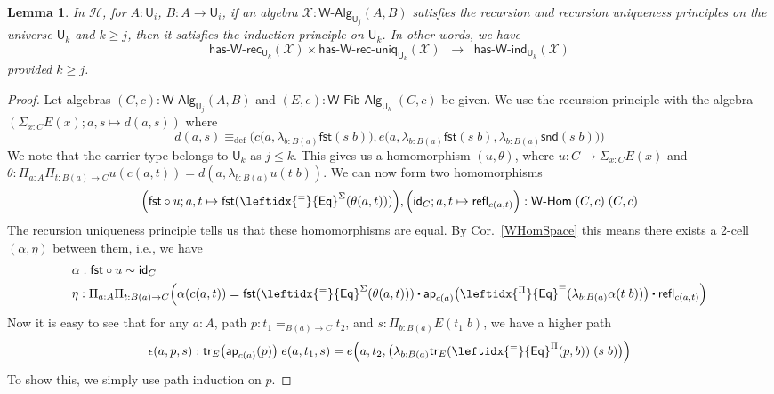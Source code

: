 \documentclass[reqno,10pt,a4paper,oneside]{amsart}
\numberwithin{equation}{section}
\theoremstyle{mythm}
\newtheorem{lemma}[theorem]{Lemma}
\theoremstyle{mydef}
\theoremstyle{myrmk}
\newcommand{\deq}{\equiv}
\newcommand{\defeq}{\deq_{\mathrm{def}}}
\newcommand{\idfun}[1]{\mathsf{id}_{#1}}
\newcommand{\comp}{\circ}
\newcommand{\Hint}{\mathcal{H}}
\newcommand{\trans}{\mathsf{tr}}
\newcommand{\ct}{%
  \mathchoice{\mathbin{\raisebox{0.5ex}{$\displaystyle\centerdot$}}}%
             {\mathbin{\raisebox{0.5ex}{$\centerdot$}}}%
             {\mathbin{\raisebox{0.25ex}{$\scriptstyle\,\centerdot\,$}}}%
             {\mathbin{\raisebox{0.1ex}{$\scriptscriptstyle\,\centerdot\,$}}}}
\newcommand{\funext}{\leftidx{^\Pi}{\mathsf{Eq}}^{=}}
\newcommand{\happly}{\leftidx{^=}{\mathsf{Eq}}^{\Pi}}
\newcommand{\idtodpair}{\leftidx{^=}{\mathsf{Eq}}^{\Sigma}}
\newcommand{\prd}[1]{\Pi_{#1}}
\newcommand{\sm}[1]{\Sigma_{#1}}
\newcommand{\lam}[1]{\lambda_{#1}}
\newcommand{\fst}{\mathsf{fst}}
\newcommand{\snd}{\mathsf{snd}}
\newcommand{\app}{\mathsf{ap}}
\newcommand{\refl}{\mathsf{refl}}
\newcommand{\UU}{\mathsf{U}}
\newcommand{\WAlg}{\mathsf{W}\text{-}\mathsf{Alg}}
\newcommand{\WFibAlg}{\mathsf{W}\text{-}\mathsf{Fib}\text{-}\mathsf{Alg}}
\newcommand{\WHom}{\mathsf{W}\text{-}\mathsf{Hom}}
\newcommand{\HasWRec}{\mathsf{has}\text{-}\mathsf{W}\text{-}\mathsf{rec}}
\newcommand{\HasWInd}{\mathsf{has}\text{-}\mathsf{W}\text{-}\mathsf{ind}}
\newcommand{\HasWRecUniq}{\mathsf{has}\text{-}\mathsf{W}\text{-}\mathsf{rec}\text{-}\mathsf{uniq}}
\newcommand{\X}{\mathcal{X}}
\begin{document}
\begin{lemma}\label{lem:WRecUniqImpIndInt}
In $\Hint$, for $A:\UU_i$, $B : A \to \UU_i$, if an algebra $\X : \WAlg_{\UU_j}(A,B)$ satisfies the recursion and recursion uniqueness principles on the universe $\UU_k$ and $k \geq j$, then it satisfies the induction principle on $\UU_k$. In other words, we have
\[ \HasWRec_{\UU_k}(\X) \times \HasWRecUniq_{\UU_k}(\X) \;\; \rightarrow \; \; \HasWInd_{\UU_k}(\X) \]
provided $k \geq j$.
\end{lemma}
\begin{proof}
Let algebras $(C,c) : \WAlg_{\UU_j}(A,B)$ and $(E,e) : \WFibAlg_{\UU_k} \; (C,c)$ be given. We use the recursion principle with the algebra $(\sm{x:C} E(x); a,s \mapsto d(a,s))$ where
\[ d(a,s) \defeq \Big(c\big(a,\lam{b:B(a)} \fst(s\;b)\big), e\big(a, \lam{b:B(a)} \fst(s\;b), \lam{b:B(a)} \snd(s\;b)\big) \Big) \]
We note that the carrier type belongs to $\UU_k$ as $j \leq k$. This gives us a homomorphism $(u,\theta)$, where $u : C \to \sm{x:C} E(x)$ and $\theta : \prd{a:A}\prd{t:B(a)\to C} u(c(a,t)) = d(a,\lam{b:B(a)}u(t\;b))$. We can now form two homomorphisms 
\[\Big(\fst \comp u; a,t \mapsto \fst(\idtodpair(\theta(a,t)))\Big), \Big(\idfun{C}; a,t \mapsto \refl_{c(a,t)}\Big) : \WHom \; (C,c) \; (C,c)\]
The recursion uniqueness principle tells us that these homomorphisms are equal. By Cor.~\ref{WHomSpace} this means there exists a 2-cell $(\alpha,\eta)$ between them, i.e., we have 
\begin{align*}
& \alpha : \fst \comp u \sim \idfun{C} \\
& \eta : \prd{a:A}\prd{t:B(a)\to C} \Big(\alpha(c(a,t)) = \fst(\idtodpair(\theta(a,t))) \ct \app_{c(a)}\big(\funext(\lam{b:B(a)} \alpha(t\;b))\big) \ct \refl_{c(a,t)}\Big)
\end{align*}
Now it is easy to see that for any $a : A$, path $p : t_1 =_{B(a) \to C} t_2$, and $s : \prd{b:B(a)} E(t_1 \; b)$, we have a higher path
\[ \epsilon(a,p,s) : \trans_E\big(\app_{c(a)}(p)\big) \; e(a,t_1,s) = e\Big(a,t_2,\big(\lam{b:B(a)} \trans_E(\happly(p,b)) \; (s \; b)\big)\Big) \] 
To show this, we simply use path induction on $p$.


\end{proof}
\end{document}

